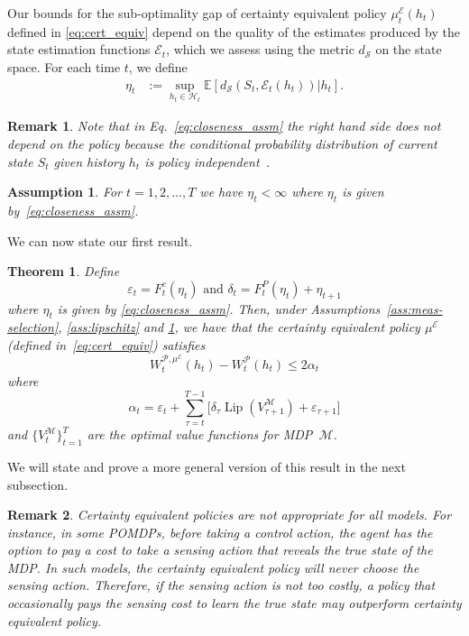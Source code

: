 \documentclass[letterpaper, 10pt]{IEEEtran}
\theoremstyle{plain}
\newtheorem{theorem}{Theorem}
\newtheorem{remark}{Remark}
\theoremstyle{nonumberplain}
\theoremstyle{plain}
\newtheorem{assumption}{Assumption}
\newcommand*\ALPHABET{\mathcal}
\newcommand*\EXP{\mathds{E}}
\newcommand\EST{\mathcal{E}}
\DeclareMathOperator{\Lip}{Lip}
\begin{document}
 Our bounds for the sub-optimality gap of certainty equivalent policy $\mu^\EST_t(h_t)$ defined in \eqref{eq:cert_equiv}
 depend on the {quality} of the estimates produced by the state estimation functions $\EST_t$, which we assess using the metric $d_{{\ALPHABET S}}$ on the state space. For each time $t$, we define
\begin{align}\label{eq:closeness_assm}
      \eta_t &:= \sup_{h_t \in \ALPHABET H_t} \EXP[ d_{\ALPHABET S}(S_t, \EST_t(h_t)) |  h_t ].
    \end{align}
    
\begin{remark}\label{rem:policy_indep}
Note that in Eq.~\eqref{eq:closeness_assm} the right hand side does not depend on the policy because the conditional probability distribution of current state $S_t$ given history $h_t$ is policy independent~\cite{Astrom1965,Smallwood1973}. 
\end{remark}

\begin{assumption}\label{ass:finite_eta}
For $t=1,2,\ldots,T$ we have $\eta_t < \infty$ where $\eta_t$ is given by~\eqref{eq:closeness_assm}.
\end{assumption}

We can now state our first result.
\begin{theorem}\label{thm:main_theorem}
Define
\[
    \varepsilon_t = F^c_t (\eta_t) \text{ and } \delta_t = F^P_t (\eta_t) + \eta_{t+1}
\]
   where $\eta_t$ is given by \eqref{eq:closeness_assm}.
    Then, under Assumptions~\ref{ass:meas-selection}, \ref{ass:lipschitz} and \ref{ass:finite_eta}, we have that the certainty equivalent policy $\mu^\EST$ (defined in~\eqref{eq:cert_equiv}) satisfies 
    \begin{equation}\label{eq:main_theorem_rep_ex1}
        W^{\ALPHABET P, \mu^\EST}_t(h_t) - W^{\ALPHABET P}_t(h_t) \le 2 \alpha_t
    \end{equation}
    where
    \begin{equation}\label{eq:alpha}
        \alpha_t = \varepsilon_t + \sum_{\tau = t}^{T-1}\bigl[ \delta_{\tau}\Lip(V^{{\ALPHABET M}}_{\tau+1}) + \varepsilon_{\tau+1} \bigr]
    \end{equation}
    and $\{V^{{\ALPHABET M}}_{t}\}_{t=1}^T$ are the optimal value functions for MDP~${\ALPHABET M}$.
\end{theorem}
We will state and prove a more general version of this result in the next subsection. 

\begin{remark}
Certainty equivalent policies are not appropriate for all models. For instance, in some POMDPs, before taking a control action, the agent has the option to pay a cost to take a sensing action that reveals the true state of the MDP. In such models, the certainty equivalent policy will never choose the sensing action. Therefore, if the sensing action is not too costly, a policy that occasionally pays the sensing cost to learn the true state may outperform certainty equivalent policy. 
\end{remark}
\end{document}
